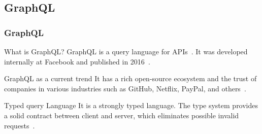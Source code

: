 \subsection{GraphQL}

\begin{frame}\frametitle{GraphQL}

  \begin{block}{What is GraphQL?}
    GraphQL is a query language for APIs~\cite{gql-spec}. It was developed internally at  Facebook and published in 2016~\cite{initial-analysis-of-gql}. 
  \end{block}

  \begin{block}{GraphQL as a current trend}
    It has a rich open-source ecosystem and the trust of companies in various industries such as GitHub, Netflix, PayPal, and others~\cite{morph-gql-1}.
  \end{block}

\begin{block}{Typed query Language}
  It is a strongly typed language. The type system provides a solid contract between client and server, which eliminates possible invalid requests~\cite{real-time-sys-arc-based-on-gql}.
\end{block}

\end{frame}

